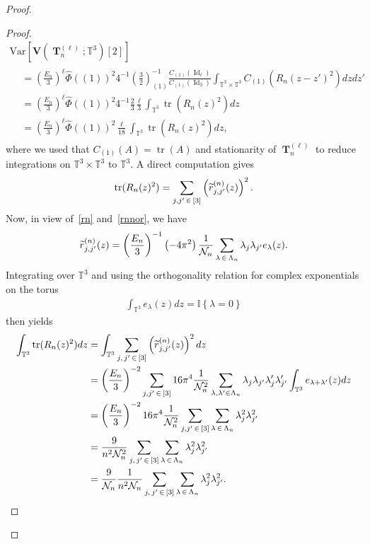 \documentclass[10pt]{amsart}
\theoremstyle{definition}\newtheorem{defi}[theo]{Definition}\newtheorem{rema}[theo]{Remark}\newtheorem{exam}[theo]{Example}\newtheorem{exem}[theo]{Example}\newtheorem{nota}[theo]{Notation}
\DeclareMathOperator{\Id}{Id}
\DeclareMathOperator{\bT}{\mathbf{T}}
\DeclareMathOperator{\Tr}{tr}
\newcommand{\bfv}{\mathbf{V}}
\newcommand{\T}{\mathbb{T}^3}
\newcommand{\V}[1]{\mathrm{Var}{\left[#1\right]}}
\newcommand{\ind}[1]{\mathbb{I}
\left\{#1\right\}}
\newcommand{\Nn}{\mathcal{N}_n}
\let\oldtilde\tilde
\renewcommand*{\tilde}[1]{\mathchoice{\widetilde{#1}}{\widetilde{#1}}{\oldtilde{#1}}{\oldtilde{#1}}}
\begin{document}
\begin{proof}
\begin{proof}
\begin{multline}
\V{\bfv\left(\bT_n^{(\ell)};\T\right)[2]}\\
\begin{aligned}
&= \left(\frac{E_n}{3}\right)^{\ell} \widehat{\Phi}((1))^2 4^{-1}\left(\frac{3}{2}\right)_{(1)}^{-1}
\frac{C_{(1)}(\Id_{\ell})}{C_{(1)}(\Id_3)} \int_{\T\times \T} C_{(1)}\left(R_n(z-z')^2\right) dzdz'\\
&= \left(\frac{E_n}{3}\right)^{\ell} \widehat{\Phi}((1))^2 4^{-1}\frac{2}{3}\frac{\ell}{3} \int_{\T} \Tr\left(R_n(z)^2\right) dz\\
&= \left(\frac{E_n}{3}\right)^{\ell} \widehat{\Phi}((1))^2
\frac{\ell}{18} \int_{\T} \Tr\left(R_n(z)^2\right) dz,
\end{aligned}
\end{multline}
where we used that $C_{(1)}(A)=\Tr(A)$ and stationarity of $\bT_n^{(\ell)}$ to reduce integrations on $\T\times \T$ to $\T$. A direct computation gives
\begin{gather*}
\Tr(R_n(z)^2) = \sum_{j,j'\,\in\,[3]} \left(\tilde{r}^{(n)}_{j,j'}(z)\right)^2.
\end{gather*}
Now, in view of~\eqref{rn} and~\eqref{rnnor}, we have
\begin{gather*}
\tilde{r}^{(n)}_{j,j'}(z) = \left(\frac{E_n}{3}\right)^{-1} \left(-4\pi^2\right) \frac{1}{\Nn} \sum_{\lambda\,\in\,\Lambda_n} \lambda_j \lambda_{j'} e_{\lambda}(z).
\end{gather*}
Integrating over $\T$ and using the orthogonality relation for complex exponentials on the torus
\begin{gather}\label{ortoexp}
\int_{\T} e_{\lambda}(z) dz = \ind{\lambda=0}
\end{gather}
then yields
\begin{align*}
\int_{\T} \Tr(R_n(z)^2) dz
&=\int_{\T} \sum_{j,\,j'\,\in\,[3]} \left(\tilde{r}^{(n)}_{j,j'}(z)\right)^2 dz\\
&= \left(\frac{E_n}{3}\right)^{-2}
\sum_{j,j'\,\in\,[3]}16\pi^4 \frac{1}{\Nn^2}\sum_{\lambda, \lambda'\in \Lambda_n} \lambda_j \lambda_{j'} \lambda'_j \lambda'_{j'}\int_{\T } e_{\lambda+\lambda'}(z)dz\\
&= \left(\frac{E_n}{3}\right)^{-2}16\pi^4 \frac{1}{\Nn^2} \sum_{j,j'\,\in\,[3]}\sum_{\lambda\,\in\,\Lambda_n} \lambda_j^2 \lambda_{j'}^2\\ 
&= \frac{9}{n^2\Nn^2}\sum_{j,\,j'\,\in\,[3]}\sum_{\lambda\,\in\,\Lambda_n} \lambda_j^2 \lambda_{j'}^2 \\
&= \frac{9}{\Nn}\frac{1}{n^2\Nn}\sum_{j,\,j'\,\in\,[3]}\sum_{\lambda\,\in\,\Lambda_n} \lambda_j^2 \lambda_{j'}^2.

\end{align*}
\end{proof}
\end{proof}
\end{document}

